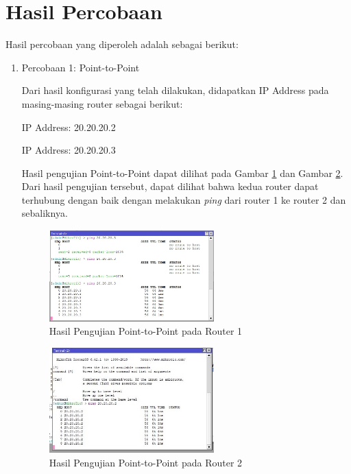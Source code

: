 \section*{Hasil Percobaan} %

Hasil percobaan yang diperoleh adalah sebagai berikut:

\begin {enumerate}
    \item Percobaan 1: Point-to-Point
    
    Dari hasil konfigurasi yang telah dilakukan, didapatkan IP Address pada masing-masing router sebagai berikut:

    \begin{tcolorbox}[colframe=blue, colback=lightgray, title=Router 1]
    IP Address: 20.20.20.2
    \end{tcolorbox}

    \begin{tcolorbox}[colframe=blue, colback=lightgray, title=Router 2]
        IP Address: 20.20.20.3
    \end{tcolorbox}
    
    Hasil pengujian Point-to-Point dapat dilihat pada Gambar \ref{fig:router1_pengujian1} dan Gambar \ref{fig:router2_pengujian1}. Dari hasil pengujian tersebut, dapat dilihat bahwa kedua router dapat terhubung dengan baik dengan melakukan \textit{ping} dari router 1 ke router 2 dan sebaliknya.

    \begin{figure}[H]
        \centering
        \includegraphics[width=0.6\textwidth]{img/router_1_pengujian1.jpeg}
        \caption{Hasil Pengujian Point-to-Point pada Router 1}
        \label{fig:router1_pengujian1}
    \end{figure}

    \begin{figure}[H]
        \centering
        \includegraphics[width=0.6\textwidth]{img/router_2_pengujian1.jpeg}
        \caption{Hasil Pengujian Point-to-Point pada Router 2}
        \label{fig:router2_pengujian1}
    \end{figure}


\end{enumerate}

